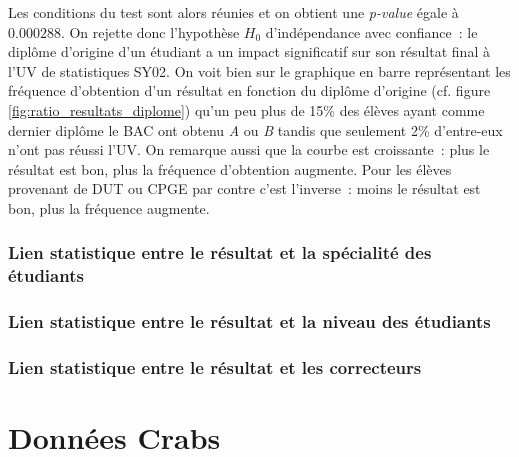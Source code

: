 \documentclass[a4paper,12pt]{report}
\begin{document}
Les conditions du test sont alors réunies et on obtient une \textit{p-value} égale à $0.000288$. On rejette donc l'hypothèse $H_{0}$ d'indépendance avec confiance~: le diplôme d'origine d'un étudiant a un impact significatif sur son résultat final à l'UV de statistiques SY02. On voit bien sur le graphique en barre représentant les fréquence d'obtention d'un résultat en fonction du diplôme d'origine (cf. figure \ref{fig:ratio_resultats_diplome}) qu'un peu plus de 15\% des élèves ayant comme dernier diplôme le BAC ont obtenu \textit{A} ou \textit{B} tandis que seulement 2\% d'entre-eux n'ont pas réussi l'UV. On remarque aussi que la courbe est croissante~: plus le résultat est bon, plus la fréquence d'obtention augmente. Pour les élèves provenant de DUT ou CPGE par contre c'est l'inverse~: moins le résultat est bon, plus la fréquence augmente.


\subsubsection{Lien statistique entre le résultat et la spécialité des étudiants}



\subsubsection{Lien statistique entre le résultat et la niveau des étudiants}



\subsubsection{Lien statistique entre le résultat et les correcteurs}




\section{Données Crabs}
\end{document}

